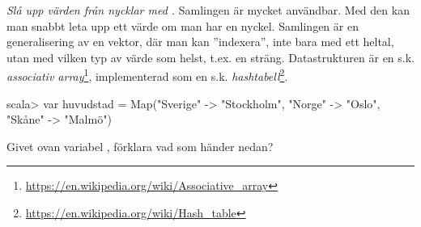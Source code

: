 {{\Subtask {}

\Subtask {}

\Subtask {}

\Subtask {}

\Subtask {}

\Subtask {}

\Subtask {}

\Subtask {}

\Subtask {}

\Subtask {}

\Subtask {}


\Task \emph{Slå upp värden från nycklar med .} Samlingen  är mycket användbar. Med den kan man snabbt leta upp ett värde om man har en nyckel. Samlingen  är en generalisering av en vektor, där man kan ''indexera'', inte bara med ett heltal, utan med vilken typ av värde som helst, t.ex. en sträng. Datastrukturen  är en s.k. \emph{associativ array}\footnote{\href{https://en.wikipedia.org/wiki/Associative_array}{https://en.wikipedia.org/wiki/Associative\_array}}, implementerad som en s.k. \emph{hashtabell}\footnote{\href{https://en.wikipedia.org/wiki/Hash_table}{https://en.wikipedia.org/wiki/Hash\_table}}. 
\begin{REPL}
scala> var huvudstad = 
  Map("Sverige" -> "Stockholm", "Norge" -> "Oslo", "Skåne" -> "Malmö") 
\end{REPL}
Givet ovan variabel , förklara vad som händer nedan?

\Subtask {}

\Subtask {}

\Subtask {}

\Subtask {}

\Subtask {}

\Subtask {} 

\Subtask {}

\Subtask {}

\Subtask {}

}}
